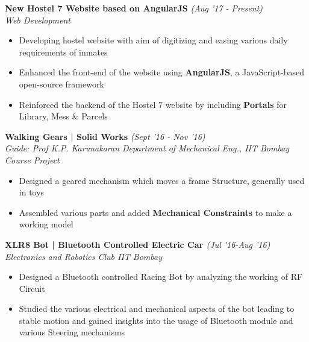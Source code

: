 \documentclass[11pt]{article}%
\begin{document}
{\flushleft \bf \large{New Hostel 7 Website based on AngularJS}} \hfill {{{\em {(Aug '17 - Present)}}}}\\
{\em{Web Development}}
\begin{itemize}
\vspace{-0.2cm}
\setlength\itemsep{0.01em}
\item Developing hostel website with aim of digitizing and easing various daily requirements of inmates
\item \nohyphens{Enhanced the front-end of the website using \textbf{AngularJS}, a JavaScript-based open-source framework}
\item Reinforced the backend of the Hostel 7 website by including \textbf{Portals} for Library, Mess \& Parcels
\end{itemize}
\vspace{-1mm}


\vspace{-2.5mm}



{\flushleft \bf \large{Walking Gears | Solid Works}} \hfill {{{\em{(Sept '16 - Nov '16)}}}} \\
{\em{Guide: Prof K.P. Karunakaran \textbar Department of Mechanical Eng., IIT Bombay \hfill {{\em {Course Project}}}}}
\vspace{-1mm}
\begin{itemize}
\setlength\itemsep{0.01em}
\item Designed a geared mechanism which moves a frame Structure, generally used in toys
\item Assembled various parts and added \textbf{Mechanical Constraints} to make a working model
\end{itemize}

\vspace{-0.3cm}








{\flushleft \bf \large{XLR8 Bot | Bluetooth Controlled Electric Car }} \hfill {{{\em{(Jul '16-Aug '16)}}}} \\
{\em{Electronics and Robotics Club \textbar IIT Bombay \hfill {{}}}}
\vspace{-1mm}
\begin{itemize}
\vspace{-0.1cm}
\setlength\itemsep{0.01em}
\item Designed a Bluetooth controlled Racing Bot by analyzing the working of RF Circuit
\item Studied the various electrical and mechanical aspects of the bot leading to stable motion and gained insights into the usage of Bluetooth module and various Steering mechanisms
\end{itemize}
\vspace{-3mm}
\end{document}
